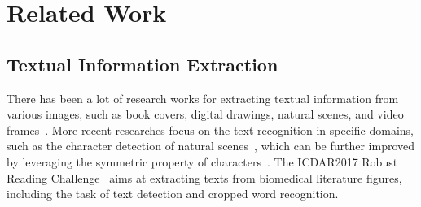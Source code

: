 \section{Related Work}
\label{sec:related}


\subsection{Textual Information Extraction}
There has been a lot of research works for
extracting textual information from various images, such as book covers,
digital drawings, natural scenes, and video frames~\cite{jung2004text}.
More recent researches focus on the text recognition in specific domains,
such as the character detection of natural scenes~\cite{yin2014robust},
which can be further improved by
leveraging the symmetric property of characters~\cite{zhang2015symmetry}.
The ICDAR2017 Robust Reading Challenge~\cite{yang2017icdar2017}
aims at extracting texts from biomedical literature figures,
including the task of text detection and cropped word recognition.

